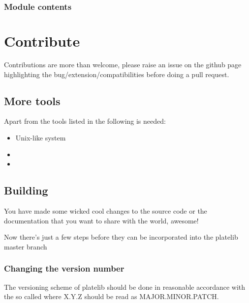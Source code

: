 \documentclass[letterpaper,10pt,english]{sphinxmanual}
\begin{document}
\subsection{Module contents}
\label{\detokenize{platelib:module-contents}}\label{\detokenize{platelib:module-platelib}}

\chapter{Contribute}
\label{\detokenize{contribute:contribute}}\label{\detokenize{contribute::doc}}
Contributions are more than welcome, please raise an issue on the github page
highlighting the bug/extension/compatibilities before doing a pull request.


\section{More tools}
\label{\detokenize{contribute:more-tools}}
Apart from the tools listed in {\hyperref[\detokenize{install:installation}]{}} the following is needed:
\begin{itemize}
\item {} 
Unix-like system

\item {} 

\item {} 

\end{itemize}


\section{Building}
\label{\detokenize{contribute:building}}\label{\detokenize{contribute:git}}
You have made some wicked cool changes to the source code
or the documentation that you want to share with the world, awesome!

Now there’s just a few steps before they can be incorporated into
the platelib master branch


\subsection{Changing the version number}
\label{\detokenize{contribute:changing-the-version-number}}
The versioning scheme of platelib should be done in reasonable
accordance with the so called  where
X.Y.Z should be read as MAJOR.MINOR.PATCH.
\end{document}
